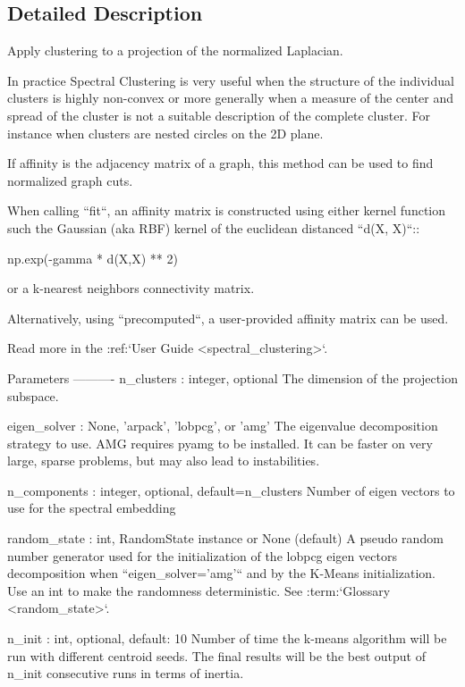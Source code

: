 \subsection{Detailed Description}
\begin{DoxyVerb}Apply clustering to a projection of the normalized Laplacian.

In practice Spectral Clustering is very useful when the structure of
the individual clusters is highly non-convex or more generally when
a measure of the center and spread of the cluster is not a suitable
description of the complete cluster. For instance when clusters are
nested circles on the 2D plane.

If affinity is the adjacency matrix of a graph, this method can be
used to find normalized graph cuts.

When calling ``fit``, an affinity matrix is constructed using either
kernel function such the Gaussian (aka RBF) kernel of the euclidean
distanced ``d(X, X)``::

        np.exp(-gamma * d(X,X) ** 2)

or a k-nearest neighbors connectivity matrix.

Alternatively, using ``precomputed``, a user-provided affinity
matrix can be used.

Read more in the :ref:`User Guide <spectral_clustering>`.

Parameters
----------
n_clusters : integer, optional
    The dimension of the projection subspace.

eigen_solver : {None, 'arpack', 'lobpcg', or 'amg'}
    The eigenvalue decomposition strategy to use. AMG requires pyamg
    to be installed. It can be faster on very large, sparse problems,
    but may also lead to instabilities.

n_components : integer, optional, default=n_clusters
    Number of eigen vectors to use for the spectral embedding

random_state : int, RandomState instance or None (default)
    A pseudo random number generator used for the initialization of the
    lobpcg eigen vectors decomposition when ``eigen_solver='amg'`` and by
    the K-Means initialization. Use an int to make the randomness
    deterministic.
    See :term:`Glossary <random_state>`.

n_init : int, optional, default: 10
    Number of time the k-means algorithm will be run with different
    centroid seeds. The final results will be the best output of
    n_init consecutive runs in terms of inertia.


\end{DoxyVerb}
